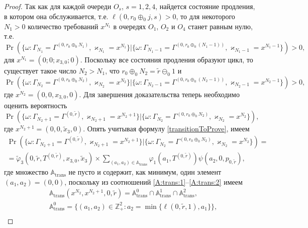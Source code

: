 \documentclass[a4paper,12pt,russian]{extarticle}
\begin{document}
\begin{proof}
Так как для каждой очереди $O_s$, $s=1,2,4$, найдется состояние продления, в котором она обслуживается, т.е. $\ell(0,r_0\oplus_{0}j,s)>0$, то для некоторого $N_1>0$ количество требований $x^{N_1}$ в очередях $O_1$, $O_2$ и $O_4$ станет равным нулю, т.е. 
\begin{equation*}
\Pr (\{\omega\colon\Gamma_{N_1}=\Gamma^{(0,r_0\oplus_{0}N_1)},\varkappa_{N_1}=x^{N_1} \}| \{\omega\colon\Gamma_{N_1-1}=\Gamma^{(0,r_0\oplus_{0}(N_1-1))},\varkappa_{N_1-1}=x^{N_1-1}\}) > 0,
\end{equation*}
для $x^{N_1}  =\left(0;0; x_{3,0};0\right)$. Поскольку все состояния продления образуют цикл, то существует такое число $N_2>N_1$, что $r_0 \oplus_0  N_2 = \tilde{r} \ominus_0 1$ и 
\begin{equation*}
\Pr (\{\omega\colon\Gamma_{N_2}=\Gamma^{(0,r_0\oplus_{0}N_2)},\varkappa_{N_2}=x^{N_2} \}| \{\omega\colon\Gamma_{N_2-1}=\Gamma^{(0,r_0\oplus_{0}(N_2-1))},\varkappa_{N_2-1}=x^{N_2-1}\}) > 0,
\end{equation*}
где $x^{N_2} = (0,0,x_{3,0},0)$.
Для завершения доказательства теперь необходимо оценить вероятность 
\begin{equation*}
\Pr (\{\omega\colon\Gamma_{N_2+1}=\Gamma^{(0,\tilde{r})},\varkappa_{N_2+1}= x^{N_2+1} \}| \{\omega\colon\Gamma_{N_2}=\Gamma^{(0,r_0\oplus_{0}N_2)},\varkappa_{N_2}=x^{N_2}\}),
\end{equation*}
где $x^{N_2+1} = (0,0,\tilde{x}_3,0)$.
Опять учитывая формулу \eqref{transitionToProve}, имеем
\begin{multline*}
\Pr (\{\omega\colon\Gamma_{N_2+1}=\Gamma^{(0,\tilde{r})},\varkappa_{N_2+1}=x^{N_2+1} \}| \{\omega\colon\Gamma_{N_2}=\Gamma^{(0,r_0\oplus_{0}N_2)},\varkappa_{N_2}=x^{N_2}\})=\\
=\widetilde{\varphi}_3(0,\tilde{r},T^{(0,\tilde{r})},x_{3,0},\tilde{x}_3)
\times
\sum_{(a_1,a_2)\in {\mathbb A}_{\mathrm{trans}}}\varphi_1(a_1,T^{(0,\tilde{r})})  \psi(a_2,0, p_{0,\tilde{r}}),
\end{multline*}
где множество ${\mathbb A}_{\mathrm{trans}}$ не пусто и содержит, как минимум, один элемент $(a_1,a_2)=(0,0)$, поскольку из соотношений \eqref{A:trans:1}--\eqref{A:trans:2} имеем
\begin{align*}
&{\mathbb A}_{\mathrm{trans}}(x^{N_2},x^{N_2+1},0,\tilde{r}) = {\mathbb A}_{\mathrm{trans}}^0 \cap {\mathbb A}_{\mathrm{trans}}^1\cap {\mathbb A}_{\mathrm{trans}}^2,\\
&{\mathbb A}_{\mathrm{trans}}^0 = \{(a_1,a_2) \in \mathbb{Z}_+^2 \colon a_2 = \min{\{\ell(0,\tilde{r},1), a_1}\} \},\\

\end{align*}
\end{proof}
\end{document}
